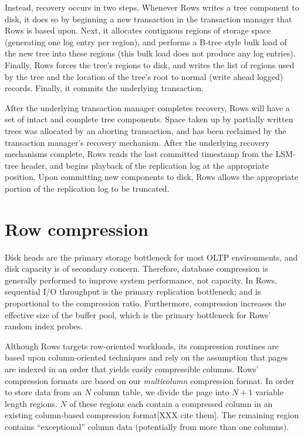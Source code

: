 \documentclass{sig-alternate-sigmod08}
\newcommand{\rows}{Rows\xspace}
\newcommand{\rowss}{Rows'\xspace}
\begin{document}
Instead, recovery occurs in two steps.  Whenever \rows writes a tree
component to disk, it does so by beginning a new transaction in the
transaction manager that \rows is based upon.  Next, it allocates
contiguous regions of storage space (generating one log entry per
region), and performs a B-tree style bulk load of the new tree into
these regions (this bulk load does not produce any log entries).
Finally, \rows forces the tree's regions to disk, and writes the list
of regions used by the tree and the location of the tree's root to
normal (write ahead logged) records.  Finally, it commits the
underlying transaction.

After the underlying transaction manager completes recovery, \rows
will have a set of intact and complete tree components.  Space taken
up by partially written trees was allocated by an aborting
transaction, and has been reclaimed by the transaction manager's
recovery mechanism.  After the underlying recovery mechanisms
complete, \rows reads the last committed timestamp from the LSM-tree
header, and begins playback of the replication log at the appropriate
position.  Upon committing new components to disk, \rows allows the
appropriate portion of the replication log to be truncated.

\section{Row compression}

Disk heads are the primary storage bottleneck for most OLTP
environments, and disk capacity is of secondary concern.  Therefore,
database compression is generally performed to improve system
performance, not capacity.  In \rows, sequential I/O throughput is the
primary replication bottleneck; and is proportional to the compression
ratio.  Furthermore, compression increases the effective size of the buffer
pool, which is the primary bottleneck for \rowss random index probes.

Although \rows targets row-oriented workloads, its compression
routines are based upon column-oriented techniques and rely on the
assumption that pages are indexed in an order that yields easily
compressible columns.  \rowss compression formats are based on our
{\em multicolumn} compression format.  In order to store data from
an $N$ column table, we divide the page into $N+1$ variable length
regions.  $N$ of these regions each contain a compressed column in an
existing column-based compression format[XXX cite them].  The
remaining region contains ``exceptional'' column data (potentially
from more than one columns).
\end{document}
